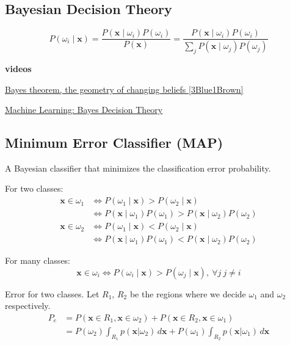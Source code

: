 \documentclass{article}
\begin{document}
\begin{multicols}{2}
\section{Bayesian Decision Theory}

\[P(\omega_i \mid \symbf{x}) = \frac{P(\symbf{x} \mid \omega_i) P(\omega_i)}{P(\symbf{x})} = \frac{P(\symbf{x} \mid \omega_i) P(\omega_i)}{\sum\limits_j P(\symbf{x} \mid \omega_j) P(\omega_j)}\]

\begin{mdframed}
	\textbf{videos}

	\href{https://www.youtube.com/watch?v=HZGCoVF3YvM}{Bayes theorem, the geometry of changing beliefs [3Blue1Brown]}

	\href{https://www.youtube.com/watch?v=4JscUHGWaB4}{Machine Learning: Bayes Decision Theory}
\end{mdframed}

\subsection{Minimum Error Classifier (MAP)}
A Bayesian classifier that minimizes the classification error probability.

For two classes:
\[\begin{split}
	\symbf{x} \in \omega_1 &\Leftrightarrow P(\omega_1 \mid \symbf{x}) > P(\omega_2 \mid \symbf{x}) \\
	&\Leftrightarrow P(\symbf{x} \mid \omega_1)P(\omega_1) > P(\symbf{x} \mid \omega_2)P(\omega_2)
\end{split}\]
\[\begin{split}
	\symbf{x} \in \omega_2 &\Leftrightarrow P(\omega_1 \mid \symbf{x}) < P(\omega_2 \mid \symbf{x}) \\
	&\Leftrightarrow P(\symbf{x} \mid \omega_1)P(\omega_1) < P(\symbf{x} \mid \omega_2)P(\omega_2)
\end{split}\]

For many classes:
\[\symbf{x} \in \omega_i \Leftrightarrow P(\omega_i \mid \symbf{x}) > P(\omega_j \mid \symbf{x}),\ \forall j\ j \neq i\]

Error for two classes. Let $R_1$, $R_2$ be the regions where we decide $\omega_1$ and $\omega_2$ respectively.
\[\begin{split}
	P_e &= P(\symbf{x} \in R_1, \symbf{x} \in \omega_2) + P(\symbf{x} \in R_2, \symbf{x} \in \omega_1) \\
	&= P(\omega_2) \int_{R_1} p(\symbf{x}|\omega_2) \, d\symbf{x} + P(\omega_1) \int_{R_2} p(\symbf{x}|\omega_1) \, d\symbf{x}
\end{split}\]


\end{multicols}
\end{document}

